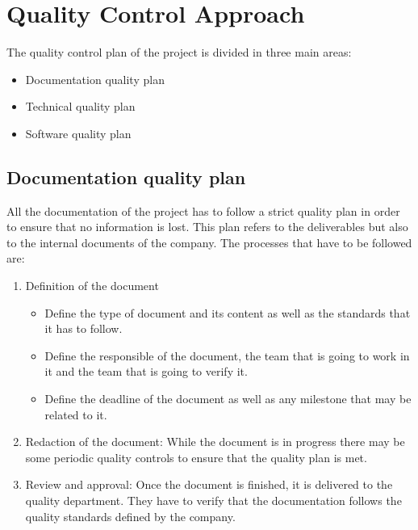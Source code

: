 \section{Quality Control Approach}


The quality control plan of the project is divided in three main areas:
\begin{itemize}
	\item Documentation quality plan
	\item Technical quality plan
	\item Software quality plan
\end{itemize}

\subsection{Documentation quality plan}
All the documentation of the project has to follow a strict quality plan in order to ensure that no information is lost. This plan refers to the deliverables but also to the internal documents of the company. The processes that have to be followed are:
\begin{enumerate}
	\item Definition of the document
	\begin{itemize}
		\item Define the type of document and its content as well as the standards that it has to follow.
		\item Define the responsible of the document, the team that is going to work in it and the team that is going to verify it.
		\item Define the deadline of the document as well as any milestone that may be related to it.
	\end{itemize}
	\item Redaction of the document: While the document is in progress there may be some periodic quality controls to ensure that the quality plan is met.
	\item Review and approval: Once the document is finished, it is delivered to the quality department. They have to verify that the documentation follows the quality standards defined by the company.
\end{enumerate}

